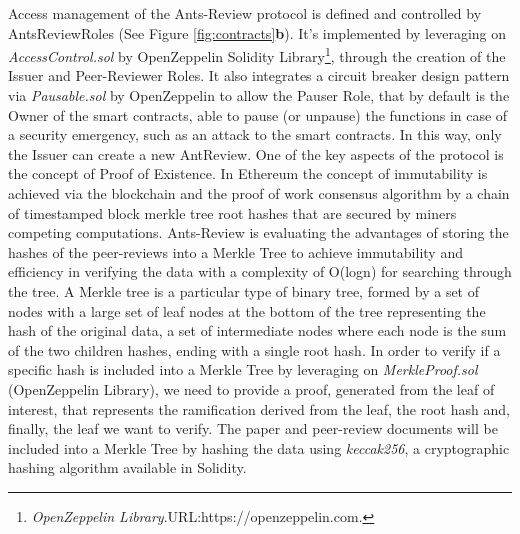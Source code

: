 \documentclass[runningheads]{llncs}
\begin{document}
Access management of the Ants-Review protocol is defined and controlled by AntsReviewRoles (See Figure \ref{fig:contracts}\textbf{b}). It's implemented by leveraging on \emph{AccessControl.sol} by OpenZeppelin Solidity Library\footnote[8]{\emph{OpenZeppelin Library}.\textsc{URL:}https://openzeppelin.com.}, through the creation of the Issuer and Peer-Reviewer Roles.
\newline It also integrates a circuit breaker design pattern via \emph{Pausable.sol} by OpenZeppelin to allow the Pauser Role, that by default is the Owner of the smart contracts, able to pause (or unpause) the functions in case of a security emergency, such as an attack to the smart contracts. In this way, only the Issuer can create a new AntReview.
\newline One of the key aspects of the protocol is the concept of Proof of Existence. In Ethereum \cite{Ethereum} the concept of immutability is achieved via the blockchain and the proof of work consensus algorithm by a chain of timestamped block merkle tree root hashes that are secured by miners competing computations.
\newline Ants-Review is evaluating the advantages of storing the hashes of the peer-reviews into a Merkle Tree \cite{BayerHaber1992} to achieve immutability and efficiency in verifying the data with a complexity of O(logn) for searching through the tree.
\newline A Merkle tree is a particular type of binary tree, formed by a set of nodes with a large set of leaf nodes at the bottom of the tree representing the hash of the original data, a set of intermediate nodes where each node is the sum of the two children hashes, ending with a single root hash. In order to verify if a specific hash is included into a Merkle Tree by leveraging on \emph{MerkleProof.sol} (OpenZeppelin Library), we need to provide a proof, generated from the leaf of interest, that represents the ramification derived from the leaf, the root hash and, finally, the leaf we want to verify.
\newline The paper and peer-review documents will be included into a Merkle Tree by hashing the data using \emph{keccak256}, a cryptographic hashing algorithm available in Solidity.
\end{document}
